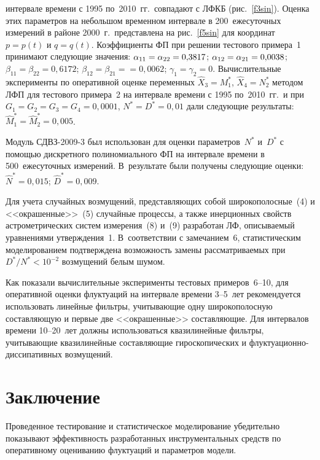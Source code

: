 \begin{multicols}{2}

\noindent
интервале времени с 1995 по~2010~гг.\
совпадают с ЛФКБ (рис.~\ref{f3sin}). Оценка этих параметров на небольшом временном интервале в 
200~ежесуточных измерений в районе 2000~г.\ представлена на рис.~\ref{f5sin} 
для координат $p=p(t)$ и $q=q(t)$. Коэффициенты ФП при решении тестового примера~1 
принимают следующие значения: $\alpha_{11}=\alpha_{22}=0{,}3817$; 
$\alpha_{12}=\alpha_{21}=0{,}0038$; $\beta_{11}=\beta_{22}=0{,}6172$; 
$\beta_{12}=\beta_{21}=$\linebreak $=0{,}0062$;  $\gamma_1=\gamma_2=0$. 
Вычислительные эксперименты по оперативной оценке переменных 
$\hat X_3=M_1^*$, $\hat X_4 =N_2^*$ методом ЛФП для тестового 
примера~2 на интервале времени с 1995 по~2010~гг.\ и при $G_1=G_2=G_3=G_4=0{,}0001$, $N^*=D^*=0{,}01$ 
дали следующие результаты: $\hat M_1^*=\hat M_2^*=0{,}005$.



Модуль СДВЗ-2009-3 был использован для оценки параметров~$N^*$ и~$D^*$ 
с помощью дискретного полиномиального ФП на интервале времени в 500~ежесуточных измерений. 
В~результате были получены следующие оценки: $\hat N^*= 0{,}015$; $\hat D^*= 0{,}009$.

Для учета случайных возмущений, пред\-став\-ляющих собой широкополосные~(4) и <<окрашенные>>~(5) 
случайные процессы, а также инерционных свойств астрометрических систем\linebreak
 измерения~(8) и~(9) 
разработан ЛФ, описываемый уравнениями утверж\-де\-ния~1. В~соответствии с замечанием~6, 
статистическим моделированием подтверждена возможность замены рассматриваемых при $D^*/ N^*<10^{-2}$ 
возмущений белым шумом.

Как показали вычислительные эксперименты тестовых примеров~6--10, для оперативной оценки 
флуктуаций на интервале времени 3--5~лет рекомендуется использовать линейные фильтры, учитывающие 
одну широкополосную составляющую и первые две <<окрашенные>> составляющие. Для интервалов времени 
10--20~лет должны использоваться квазилинейные фильтры, учитывающие квазилинейные составляющие 
гироскопических и флук\-ту\-а\-ци\-он\-но-диссипативных возмущений.


\section{Заключение}

Проведенное тестирование и статистическое моделирование убедительно 
показывают эффективность разработанных инструментальных средств по 
оперативному оцениванию флуктуаций и параметров модели.


\end{multicols}
